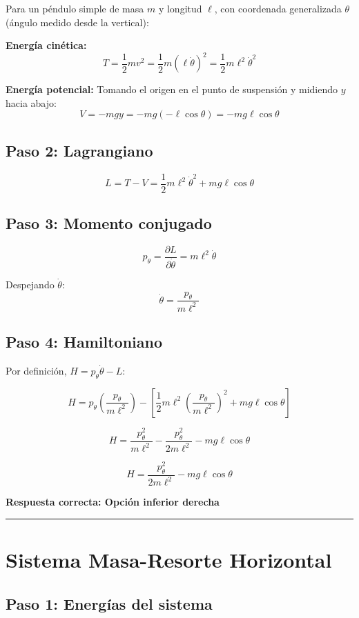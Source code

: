 \documentclass[a4paper]{article}
\begin{document}
Para un péndulo simple de masa $m$ y longitud $\ell$, con coordenada generalizada $\theta$ (ángulo medido desde la vertical):

\textbf{Energía cinética:}
$$T = \frac{1}{2}mv^2 = \frac{1}{2}m(\ell\dot{\theta})^2 = \frac{1}{2}m\ell^2\dot{\theta}^2$$

\textbf{Energía potencial:}
Tomando el origen en el punto de suspensión y midiendo $y$ hacia abajo:
$$V = -mgy = -mg(-\ell\cos\theta) = -mg\ell\cos\theta$$

\subsection*{Paso 2: Lagrangiano}

$$L = T - V = \frac{1}{2}m\ell^2\dot{\theta}^2 + mg\ell\cos\theta$$

\subsection*{Paso 3: Momento conjugado}

$$p_\theta = \frac{\partial L}{\partial \dot{\theta}} = m\ell^2\dot{\theta}$$

Despejando $\dot{\theta}$:
$$\dot{\theta} = \frac{p_\theta}{m\ell^2}$$

\subsection*{Paso 4: Hamiltoniano}

Por definición, $H = p_\theta\dot{\theta} - L$:

$$H = p_\theta\left(\frac{p_\theta}{m\ell^2}\right) - \left[\frac{1}{2}m\ell^2\left(\frac{p_\theta}{m\ell^2}\right)^2 + mg\ell\cos\theta\right]$$

$$H = \frac{p_\theta^2}{m\ell^2} - \frac{p_\theta^2}{2m\ell^2} - mg\ell\cos\theta$$

$$\boxed{H = \frac{p_\theta^2}{2m\ell^2} - mg\ell\cos\theta}$$

\textbf{Respuesta correcta: Opción inferior derecha}

\vspace{1em}
\hrule
\vspace{1em}

\section*{Sistema Masa-Resorte Horizontal}

\subsection*{Paso 1: Energías del sistema}
\end{document}
